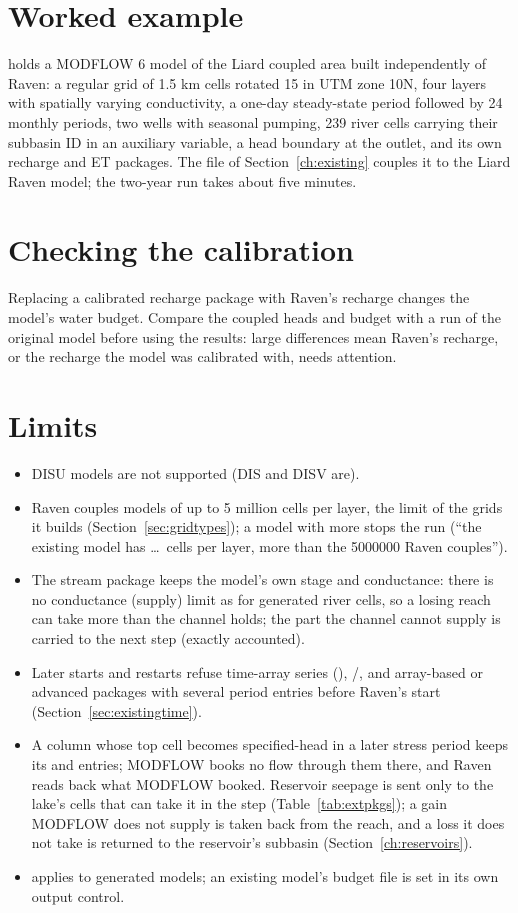 \section{Worked example}
 holds a MODFLOW 6 model of the Liard coupled area built independently of Raven: a
regular grid of 1.5 km cells rotated 15\textdegree{} in UTM zone 10N, four layers with spatially varying conductivity,
a one-day steady-state period followed by 24 monthly periods, two wells with seasonal pumping, 239 river cells carrying
their subbasin ID in an auxiliary variable, a head boundary at the outlet, and its own recharge and ET packages. The 
file of Section~\ref{ch:existing} couples it to the Liard Raven model; the two-year run takes about five minutes.

\section{Checking the calibration}
Replacing a calibrated recharge package with Raven's recharge changes the model's water budget. Compare the coupled heads and
budget with a run of the original model before using the results: large differences mean Raven's recharge, or the
recharge the model was calibrated with, needs attention.

\section{Limits}\label{sec:extlimits}
\begin{itemize}
\item DISU models are not supported (DIS and DISV are).
\item Raven couples models of up to 5 million cells per layer, the limit of the grids it builds (Section~\ref{sec:gridtypes});
a model with more stops the run (``the existing model has \dots\ cells per layer, more than the 5000000 Raven couples'').
\item The stream package keeps the model's own stage and conductance: there is no conductance (supply) limit as for generated
river cells, so a losing reach can take more than the channel holds; the part the channel cannot supply is carried to the
next step (exactly accounted).
\item Later starts and restarts refuse time-array series (), /,
and array-based or advanced packages with several period entries before Raven's start
(Section~\ref{sec:existingtime}).
\item A column whose top cell becomes specified-head in a later stress period keeps its  and 
entries; MODFLOW books no flow through them there, and Raven reads back what MODFLOW booked. Reservoir seepage is sent only
to the lake's cells that can take it in the step (Table~\ref{tab:extpkgs}); a gain MODFLOW does not supply is taken back from
the reach, and a loss it does not take is returned to the reservoir's subbasin (Section~\ref{ch:reservoirs}).
\item {} applies to generated models; an existing model's budget file is set in its own output control.
\end{itemize}
